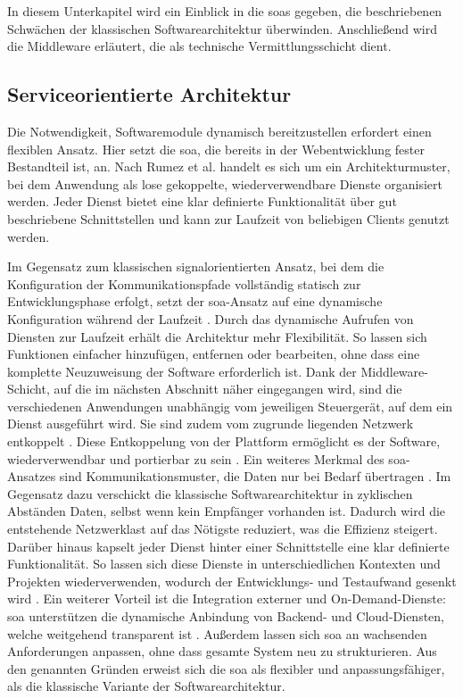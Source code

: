 In diesem Unterkapitel wird ein Einblick in die \glspl{soa} gegeben, die beschriebenen Schwächen der klassischen Softwarearchitektur überwinden. Anschließend wird die Middleware erläutert, die als technische Vermittlungsschicht dient.

\subsection{Serviceorientierte Architektur}
\label{subsect:soa}
Die Notwendigkeit, Softwaremodule dynamisch bereitzustellen erfordert einen flexiblen Ansatz. Hier setzt die \gls{soa}, die bereits in der Webentwicklung fester Bestandteil ist, an. Nach Rumez et al.\cite{rumezOverviewAutomotiveServiceOriented2020} handelt es sich um ein Architekturmuster, bei dem Anwendung als lose gekoppelte, wiederverwendbare Dienste organisiert werden. Jeder Dienst bietet eine klar definierte Funktionalität über gut beschriebene Schnittstellen und kann zur Laufzeit von beliebigen Clients genutzt werden.

Im Gegensatz zum klassischen signalorientierten Ansatz, bei dem die Konfiguration der Kommunikationspfade vollständig statisch zur Entwicklungsphase erfolgt, setzt der \gls{soa}-Ansatz auf eine dynamische Konfiguration während der Laufzeit \cite{rumezOverviewAutomotiveServiceOriented2020}. Durch das dynamische Aufrufen von Diensten zur Laufzeit erhält die Architektur mehr Flexibilität. So lassen sich Funktionen einfacher hinzufügen, entfernen oder bearbeiten, ohne dass eine komplette Neuzuweisung der Software erforderlich ist. Dank der Middleware-Schicht, auf die im nächsten Abschnitt näher eingegangen wird, sind die verschiedenen Anwendungen unabhängig vom jeweiligen Steuergerät, auf dem ein Dienst ausgeführt wird. Sie sind zudem vom zugrunde liegenden Netzwerk entkoppelt \cite{kugeleModelbasedResourceAnalysis2021}. Diese Entkoppelung von der Plattform ermöglicht es der Software, wiederverwendbar und portierbar zu sein \cite{cebotari2020}. Ein weiteres Merkmal des \gls{soa}-Ansatzes sind Kommunikationsmuster, die Daten nur bei Bedarf übertragen \cite{rumezOverviewAutomotiveServiceOriented2020}. Im Gegensatz dazu verschickt die klassische Softwarearchitektur in zyklischen Abständen Daten, selbst wenn kein Empfänger vorhanden ist. Dadurch wird die entstehende Netzwerklast auf das Nötigste reduziert, was die Effizienz  steigert. Darüber hinaus kapselt jeder Dienst hinter einer Schnittstelle eine klar definierte Funktionalität. So lassen sich diese Dienste in unterschiedlichen Kontexten und Projekten wiederverwenden, wodurch der Entwicklungs- und Testaufwand gesenkt wird \cite{rumezOverviewAutomotiveServiceOriented2020}\cite{cebotari2020}. Ein weiterer Vorteil ist die Integration externer und On-Demand-Dienste: \gls{soa} unterstützen die dynamische Anbindung von Backend- und Cloud-Diensten, welche weitgehend transparent ist \cite{rumezOverviewAutomotiveServiceOriented2020}\cite{henle2022}. Außerdem lassen sich \gls{soa} an wachsenden Anforderungen anpassen, ohne dass  gesamte System neu zu strukturieren. Aus den genannten Gründen erweist sich die \gls{soa} als flexibler und anpassungsfähiger, als die klassische Variante der Softwarearchitektur.

